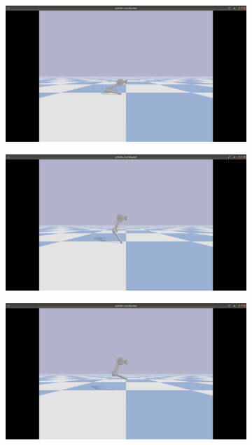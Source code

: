 \documentclass[onecolumn, letter paper]{report}
\begin{document}
\begin{figure}[htb!]
    \centering
    \begin{subfigure}{.24\textwidth}
    \includegraphics[width=\textwidth, trim={25cm 10cm 25cm 5cm}, clip]{figures/sim0.4m/s41.png}
    \end{subfigure}
    \begin{subfigure}{.24\textwidth}
    \includegraphics[width=\textwidth, trim={25cm 10cm 25cm 5cm}, clip]{figures/sim0.4m/s42.png}
    \end{subfigure}
    \begin{subfigure}{.24\textwidth}
    \includegraphics[width=\textwidth, trim={25cm 10cm 25cm 5cm}, clip]{figures/sim0.4m/s43.png}

\end{subfigure}
\end{figure}
\end{document}
